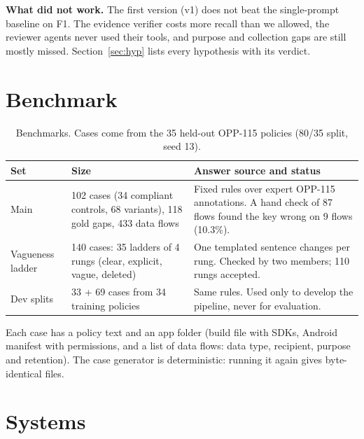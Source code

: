 \documentclass[11pt,a4paper]{article}
\begin{document}
\textbf{What did not work.} The first version (v1) does not beat the single-prompt baseline on F1.
The evidence verifier costs more recall than we allowed, the reviewer agents never used their tools,
and purpose and collection gaps are still mostly missed. Section~\ref{sec:hyp} lists every
hypothesis with its verdict.

\section{Benchmark}

\begin{table}[H]
\centering
\small
\begin{tabular}{p{2.6cm}p{5.4cm}p{6.2cm}}
\toprule
Set & Size & Answer source and status \\
\midrule
Main & 102 cases (34 compliant controls, 68 variants), 118 gold gaps, 433 data flows &
Fixed rules over expert OPP-115 annotations. A hand check of 87 flows found the key wrong on
9 flows (10.3\%). \\
Vagueness ladder & 140 cases: 35 ladders of 4 rungs (clear, explicit, vague, deleted) &
One templated sentence changes per rung. Checked by two members; 110 rungs accepted. \\
Dev splits & 33 + 69 cases from 34 training policies & Same rules. Used only to develop the
pipeline, never for evaluation. \\
\bottomrule
\end{tabular}
\caption{Benchmarks. Cases come from the 35 held-out OPP-115 policies (80/35 split, seed 13).}
\end{table}

Each case has a policy text and an app folder (build file with SDKs, Android manifest with
permissions, and a list of data flows: data type, recipient, purpose and retention). The case
generator is deterministic: running it again gives byte-identical files.

\section{Systems}
\end{document}
